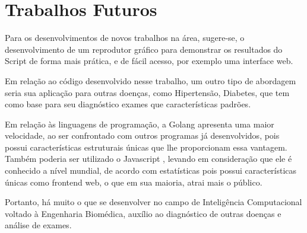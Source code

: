 \chapter{Trabalhos Futuros}
\label{chapter:trabalhos_futuros}

Para os desenvolvimentos de novos trabalhos na área, sugere-se,
o desenvolvimento de um reprodutor gráfico para demonstrar os resultados do Script de forma mais prática, e de fácil acesso, por exemplo uma interface web.

Em relação ao código desenvolvido nesse trabalho, um outro tipo de abordagem seria sua aplicação para outras doenças,
como Hipertensão, Diabetes, que tem como base para seu diagnóstico exames que características padrões.

Em relação às linguagens de programação, a Golang \cite{GO} apresenta uma maior velocidade,
ao ser confrontado com outros programas já desenvolvidos, pois possui características estruturais únicas que lhe proporcionam essa vantagem.
Também poderia ser utilizado o Javascript \cite{JAVASCRIPT}, levando em consideração que ele é conhecido a nível mundial,
de acordo com estatísticas pois possui características únicas como frontend web, o que em sua maioria, atrai mais o público.

Portanto, há muito o que se desenvolver no campo de Inteligência Computacional voltado à Engenharia Biomédica,
auxílio ao diagnóstico de outras doenças e análise de exames.
